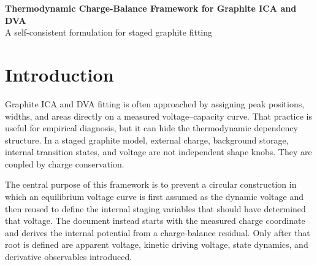 \documentclass[11pt,a4paper]{article}
\begin{document}
\begin{center}
{\LARGE\bfseries Thermodynamic Charge-Balance Framework for Graphite ICA and DVA}\\[0.8em]
{\large A self-consistent formulation for staged graphite fitting}
\end{center}

\begin{abstract}
This document develops a charge-balance foundation for graphite-anode incremental-capacity analysis (ICA) and differential-voltage analysis (DVA). The formulation starts from the measured external charge coordinate, decomposes graphite storage into background and staging contributions, and defines the internal graphite potential as the solution of an algebraic charge-balance constraint. The equilibrium open-circuit relation is treated as a special equilibrium root, not as the primary dynamic voltage input. Dynamic staging variables then form a self-consistent differential-algebraic or Volterra-like problem, which can be solved directly or approximated by a reference-closure strategy. Later heat, kinetic, fitting, and hysteresis models are introduced only as controlled interfaces that preserve the charge-balance foundation.
\end{abstract}

\tableofcontents
\newpage

\section{Introduction}

Graphite ICA and DVA fitting is often approached by assigning peak positions, widths, and areas directly on a measured voltage--capacity curve. That practice is useful for empirical diagnosis, but it can hide the thermodynamic dependency structure. In a staged graphite model, external charge, background storage, internal transition states, and voltage are not independent shape knobs. They are coupled by charge conservation.

The central purpose of this framework is to prevent a circular construction in which an equilibrium voltage curve is first assumed as the dynamic voltage and then reused to define the internal staging variables that should have determined that voltage. The document instead starts with the measured charge coordinate and derives the internal potential from a charge-balance residual. Only after that root is defined are apparent voltage, kinetic driving voltage, state dynamics, and derivative observables introduced.
\end{document}

